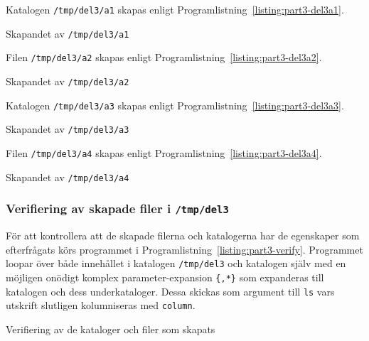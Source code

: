 Katalogen \texttt{/tmp/del3/a1} skapas enligt Programlistning~\ref{listing:part3-del3a1}.

\begin{listing}[H]
\caption{Skapandet av \texttt{/tmp/del3/a1}}
\label{listing:part3-del3a1}
\end{listing}


Filen \texttt{/tmp/del3/a2} skapas enligt Programlistning~\ref{listing:part3-del3a2}.

\begin{listing}[H]
\caption{Skapandet av \texttt{/tmp/del3/a2}}
\label{listing:part3-del3a2}
\end{listing}


Katalogen \texttt{/tmp/del3/a3} skapas enligt Programlistning~\ref{listing:part3-del3a3}.

\begin{listing}[H]
\caption{Skapandet av \texttt{/tmp/del3/a3}}
\label{listing:part3-del3a3}
\end{listing}


Filen \texttt{/tmp/del3/a4} skapas enligt Programlistning~\ref{listing:part3-del3a4}.

\begin{listing}[H]
\caption{Skapandet av \texttt{/tmp/del3/a4}}
\label{listing:part3-del3a4}
\end{listing}


\subsubsection{Verifiering av skapade filer i \texttt{/tmp/del3}}
För att kontrollera att de skapade filerna och katalogerna har de egenskaper
som efterfrågats körs programmet i Programlistning~\ref{listing:part3-verify}.
Programmet loopar över både innehållet i katalogen \texttt{/tmp/del3} och
katalogen själv med en möjligen onödigt komplex parameter-expansion
\texttt{\{,*\}} som expanderas till katalogen och dess underkataloger.  Dessa
skickas som argument till \texttt{ls} vars utskrift slutligen kolumniseras med
\texttt{column}.

\begin{listing}[H]
\caption{Verifiering av de kataloger och filer som skapats}
\label{listing:part3-verify}
\end{listing}

